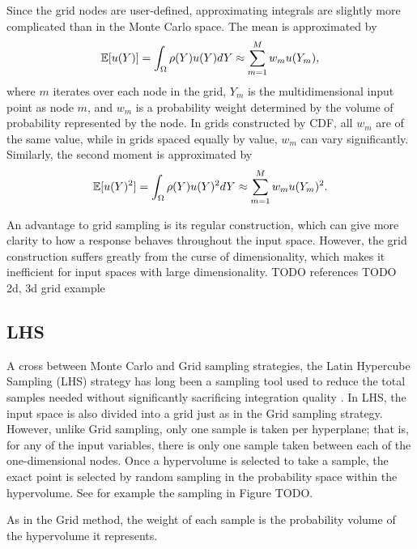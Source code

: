 Since the grid nodes are user-defined, approximating integrals are slightly more complicated than in the Monte
Carlo space.  The mean is approximated by
\begin{equation}
  \mathbb{E}[ u(Y)] = \int_\Omega \rho(Y) u(Y) dY \approx \sum_{m=1}^M w_m u(Y_m),
\end{equation}
where $m$ iterates over each node in the grid, $Y_m$ is the multidimensional input point as node $m$, and
$w_m$ is a probability weight determined by the volume of probability represented by the node.  In grids
constructed by CDF, all $w_m$ are of the same value, while in grids spaced equally by value, $w_m$ can vary
significantly.  Similarly, the second moment is approximated by
\begin{equation}
  \mathbb{E}[ u(Y)^2] = \int_\Omega \rho(Y) u(Y)^2 dY \approx \sum_{m=1}^M w_m u(Y_m)^2.
\end{equation}

An advantage to grid sampling is its regular construction, which can give more clarity to how a response
behaves throughout the input space.  However, the grid construction suffers greatly from the curse of
dimensionality, which makes it inefficient for input spaces with large dimensionality. TODO references
TODO 2d, 3d grid example

\subsection{LHS}
A cross between Monte Carlo and Grid sampling strategies, the Latin Hypercube Sampling (LHS) strategy 
has long been a sampling tool used to reduce
the total samples needed without significantly sacrificing integration quality \cite{lhs}.  In LHS, the input
space is also divided into a grid just as in the Grid sampling strategy.  However, unlike Grid sampling, only
one sample is taken per hyperplane; that is, for any of the input variables, there is only one sample taken
between each of the one-dimensional nodes.  Once a hypervolume is selected to take a sample, the exact
point is selected by random sampling in the probability space within the hypervolume.  See for example the
sampling in Figure TODO.

As in the Grid method, the weight of each sample is the probability volume of the hypervolume it represents.

